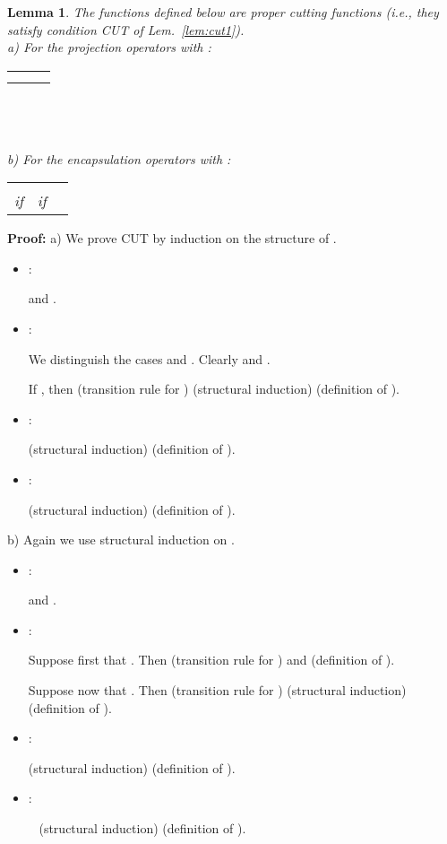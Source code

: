 \documentclass{eptcs}
\newtheorem{lemm}{Lemma}
\newenvironment{lemma}{\begin{lemm} \rm }{\end{lemm}}
\newenvironment{proof}{\begin{trivlist} \item[\hspace{\labelsep}\bf Proof:]}{\hfill  \end{trivlist}}
\begin{document}
\begin{lemma} 
\label{lem:cut3}
The functions  defined below are proper cutting functions (i.e., they satisfy condition CUT of Lem.~\ref{lem:cut1}).\vspace{4mm}\\
a) For the projection operators  with :\vspace{2mm}\\
\begin{tabular}{lll}
 &
 &
 \vspace{2mm} \\
 & 
\end{tabular}
\\ \\ \\
b) For the encapsulation operators  with :\vspace{2mm}\\
\begin{tabular}{lll}
 &
 &
 \vspace{2mm} \\
 if  &
 if 
\end{tabular}
\end{lemma}
\begin{proof}
a) We prove CUT by induction on the structure of .
\begin{itemize}
\item :

  and .

\item :

We distinguish the cases  and .
Clearly  and .

If , then  (transition rule for )
 (structural induction)
 (definition of ).

\item :

 (structural induction)
 (definition of ).

\item :

 (structural induction)
  (definition of ).
\end{itemize}



b) Again we use structural induction on .
\begin{itemize}
\item :

  and .

\item :

Suppose first that . Then  (transition rule for )
and  (definition of ).

Suppose now that .
Then 
 (transition rule for )
 (structural induction)
 (definition of ).

\item :

 (structural induction)
 (definition of ).

\item :

 ~
 (structural induction)
  (definition of ).
\end{itemize}

\end{proof}
\end{document}
